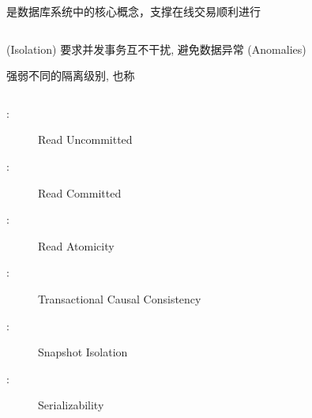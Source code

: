 
\begin{frame}{}
  \begin{center}
    是数据库系统中的核心概念，支撑在线交易顺利进行
  \end{center}

  \begin{columns}
  \end{columns}

  \vspace{0.30cm}
  \begin{center}
     (Isolation) 要求并发事务互不干扰, 避免数据异常 (Anomalies)
  \end{center}
\end{frame}

\begin{frame}{}
  \begin{center}
    强弱不同的隔离级别, 也称

    \vspace{0.30cm}

    \begin{columns}
        \begin{description}
          \item[\ru:] Read Uncommitted
          \item[\rc:] Read Committed
          \item[\ra:] Read Atomicity
          \item[\tcc:] Transactional Causal Consistency
          \item[\si:] Snapshot Isolation
          \item[\ser:] Serializability
        \end{description}
    \end{columns}
  \end{center}
\end{frame}


